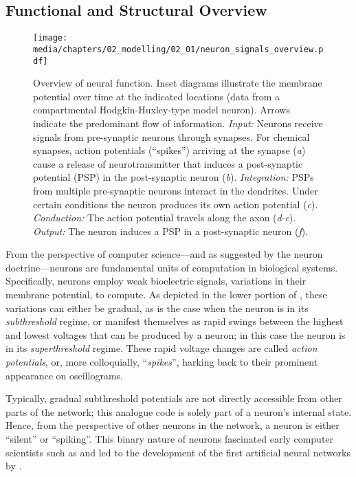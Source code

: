 \subsection{Functional and Structural Overview}
\label{sec:neurons_overview}

\begin{figure}
	\centering
	\texttt{[image: media/chapters/02\_modelling/02\_01/neuron\_signals\_overview.pdf]}
	\caption[Overview of neural function]{Overview of neural function. Inset diagrams illustrate the membrane potential over time at the indicated locations (data from a compartmental Hodgkin-Huxley-type model neuron). Arrows indicate the predominant flow of information. \emph{Input:} Neurons receive signals from pre-synaptic neurons through synapses. For chemical synapses, action potentials (\enquote{spikes}) arriving at the synapse (\emph{a}) cause a release of neurotransmitter that induces a post-synaptic potential (PSP) in the post-synaptic neuron (\emph{b}). \emph{Integration:} PSPs from multiple pre-synaptic neurons interact in the dendrites. Under certain conditions the neuron produces its own action potential (\emph{c}). \emph{Conduction:} The action potential travels along the axon (\emph{d}-\emph{e}). \emph{Output:} The neuron induces a PSP in a post-synaptic neuron (\emph{f}).
	}
	\label{fig:neuron_signal_overview}
\end{figure}

From the perspective of computer science---and as suggested by the neuron doctrine---neurons are fundamental units of computation in biological systems.
Specifically, neurons employ weak bioelectric signals, variations in their membrane potential, to compute.
As depicted in the lower portion of , these variations can either be gradual, as is the case when the neuron is in its \emph{subthreshold} regime, or manifest themselves as rapid swings between the highest and lowest voltages that can be produced by a neuron; in this case the neuron is in its \emph{superthreshold} regime.
These rapid voltage changes are called \emph{action potentials}, or, more colloquially, \enquote{\emph{spikes}}, harking back to their prominent appearance on oscillograms.

Typically, gradual subthreshold potentials are not directly accessible from other parts of the network;
this analogue code is solely part of a neuron's internal state.
Hence, from the perspective of other neurons in the network, a neuron is either \enquote{silent} or \enquote{spiking}.
This binary nature of neurons fascinated early computer scientists such as \citet{vonneumann1958computer} and led to the development of the first artificial neural networks by \citet{mcculloch1943logical}.

